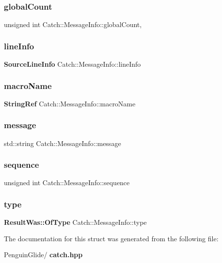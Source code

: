 \subsubsection{globalCount}
{\footnotesize\ttfamily unsigned int Catch\+::\+Message\+Info\+::global\+Count\hspace{0.3cm}{\ttfamily [static]}, {\ttfamily [private]}}

\mbox{\label{struct_catch_1_1_message_info_a985165328723e599696ebd8e43195cc5}} 
\subsubsection{lineInfo}
{\footnotesize\ttfamily \textbf{ Source\+Line\+Info} Catch\+::\+Message\+Info\+::line\+Info}

\mbox{\label{struct_catch_1_1_message_info_a3ee7cd41def0989d2193bad7101436a0}} 
\subsubsection{macroName}
{\footnotesize\ttfamily \textbf{ String\+Ref} Catch\+::\+Message\+Info\+::macro\+Name}

\mbox{\label{struct_catch_1_1_message_info_ab6cd06e050bf426c6577502a5c50e256}} 
\subsubsection{message}
{\footnotesize\ttfamily std\+::string Catch\+::\+Message\+Info\+::message}

\mbox{\label{struct_catch_1_1_message_info_a7f4f57ea21e50160adefce7b68a781d6}} 
\subsubsection{sequence}
{\footnotesize\ttfamily unsigned int Catch\+::\+Message\+Info\+::sequence}

\mbox{\label{struct_catch_1_1_message_info_ae928b9117465c696e45951d9d0284e78}} 
\subsubsection{type}
{\footnotesize\ttfamily \textbf{ Result\+Was\+::\+Of\+Type} Catch\+::\+Message\+Info\+::type}



The documentation for this struct was generated from the following file\+:\begin{DoxyCompactItemize}
\item 
Penguin\+Glide/\textbf{ catch.\+hpp}\end{DoxyCompactItemize}
